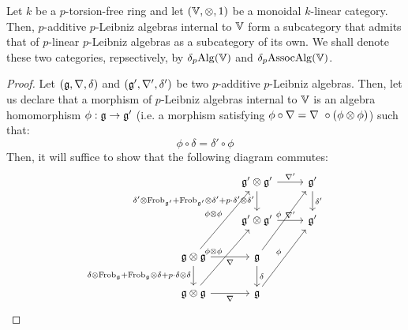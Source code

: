             \begin{claim}
                Let $k$ be a $p$-torsion-free ring and let $(\V, \tensor, 1)$ be a monoidal $k$-linear category. Then, $p$-additive $p$-Leibniz algebras internal to $\mathbb{V}$ form a subcategory that admits that of $p$-linear $p$-Leibniz algebras as a subcategory of its own. We shall denote these two categories, repsectively, by $\delta_p\mathrm{Alg}(\mathbb{V})$ and $\delta_p\mathrm{Assoc}\mathrm{Alg}(\mathbb{V})$.
            \end{claim}
                \begin{proof}
                    Let $(\mathfrak{g}, \nabla, \delta)$ and $(\mathfrak{g}', \nabla', \delta')$ be two $p$-additive $p$-Leibniz algebras. Then, let us declare that a morphism of $p$-Leibniz algebras internal to $\mathbb{V}$ is an algebra homomorphism $\phi: \mathfrak{g} \to \mathfrak{g}'$ (i.e. a morphism satisfying $\phi \circ \nabla = \nabla\ \circ (\phi \tensor \phi)$) such that:
                        $$\phi \circ \delta = \delta' \circ \phi$$
                    Then, it will suffice to show that the following diagram commutes:
                        $$
                            \begin{tikzcd}
                            	& {\g' \tensor \g'} & {\g'} \\
                            	& {\g' \tensor \g'} & {\g'} \\
                            	{\g \tensor \g} & {\g} \\
                            	{\g \tensor \g} & {\g}
                            	\arrow["{\phi \tensor \phi}", from=3-1, to=1-2]
                            	\arrow["{\phi}", from=3-2, to=1-3]
                            	\arrow["{\phi}", from=4-2, to=2-3]
                            	\arrow["{\delta'}", from=1-3, to=2-3]
                            	\arrow["{\nabla'}", from=1-2, to=1-3]
                            	\arrow["{\delta' \tensor \Frob_{\g'} + \Frob_{\g'} \tensor \delta' + p \cdot \delta' \tensor \delta'}"', from=1-2, to=2-2]
                            	\arrow["{\nabla'}", from=2-2, to=2-3]
                            	\arrow["{\delta}", from=3-2, to=4-2]
                            	\arrow["{\delta \tensor \Frob_{\g} + \Frob_{\g} \tensor \delta + p \cdot \delta \tensor \delta}"', from=3-1, to=4-1]
                            	\arrow["{\nabla}"', from=4-1, to=4-2]
                            	\arrow["{\nabla}"', from=3-1, to=3-2]
                            	\arrow["{\phi \tensor \phi}", from=4-1, to=2-2]
                            \end{tikzcd}
$$
\end{proof}

